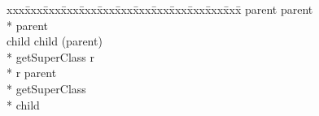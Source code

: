 {\small\it\begin{minipage}{\textwidth}\begin{tabbing}
xxx\=xxx\=xxx\=xxx\=xxx\=xxx\=xxx\=xxx\=xxx\=xxx\=xxx\=xxx\=xxx\=\+\kill%
 parent \assign{}  parent \\*{}%
 parent\\[1.0ex]{}%
 child \assign{}  child (parent)\+\\*{}%
     getSuperClass \returns{} \/\LB{}r \CO{} \/\RB{}\+\\*{}%
    r \assign{} parent\-\\*{}%
   getSuperClass\-\\*{}%
 child
\end{tabbing}\end{minipage}}


